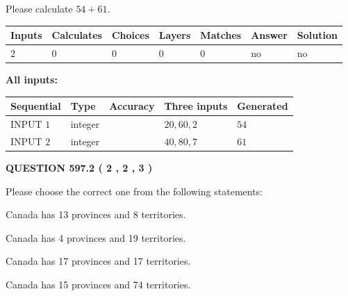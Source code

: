 \documentclass[12pt]{article}
\begin{document}
  
 
Please calculate $ %
54 +  %
61 $.
 
 
   
   
   
   
\noindent\begin{tabular}{|l|l|l|l|l|l|l|}
 \hline
Inputs & Calculates & Choices & Layers & Matches & Answer & Solution \\ \hline
 2  & 
 0  & 
 0
  & 
 0  & 
 0  & 
  no & 
  no 
  \\ \hline
 \end{tabular}
   
   
   
   
\noindent{}
   
   
   
   
\noindent\vspace{0.1in}\hspace{-0.08in} {\textbf{\Large{All inputs: }}}
   
   
  
  
\noindent\begin{tabular}{|l|l|l|l|l|}
\hline
 Sequential & Type & Accuracy & Three inputs & Generated \\ 
\hline
 
 
  INPUT $  1 $ & integer &  & $
 20
 , 
 60
 , 
 2
 $ & $ 54 $ 
 \\  \hline  
 
 
  INPUT $  2 $ & integer &  & $
 40
 , 
 80
 , 
 7
 $ & $ 61 $ 
 \\  \hline  
 \end{tabular}
   
   
  
\vspace{0.2in}
  
{\textbf{\Large{QUESTION
597.2 
 ( 2 , 2 , 3 )
}}}
  
  
Please choose the correct one from the following statements:
 
 
Canada has  13 provinces and  8 territories.
 
 
Canada has   4 provinces and  19 territories.
 
 
Canada has  17 provinces and  17 territories.
 
 
Canada has  15 provinces and  74 territories.
 
\end{document}
